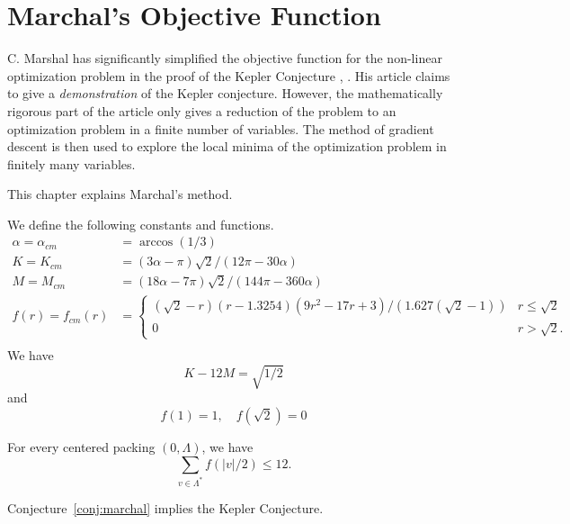 
\chapter{Marchal's Objective Function}

C. Marshal has significantly simplified the objective function
for the non-linear optimization problem in the proof of the Kepler
Conjecture \cite{Mar08}, \cite{Marc07}.  His article claims to give
a {\it demonstration} of the Kepler conjecture.  However, the
mathematically rigorous part of the article only gives a reduction
of the problem to an optimization problem in a finite number of
variables.  The method of gradient descent is then used to explore
the local minima of the optimization problem in finitely many variables.

This chapter explains Marchal's method.  

We define the following constants and functions.
$$
\begin{array}{lll}
\alpha=\alpha_{cm} &= \arccos(1/3)\\
K=K_{cm} &= (3\alpha-\pi)\sqrt2/(12\pi - 30\alpha)\\
M = M_{cm} &= (18\alpha-7\pi)\sqrt2/(144\pi-360\alpha)\\
f(r) = f_{cm}(r) &=
\begin{cases}
 (\sqrt2-r) (r-1.3254) (9r^2 - 17 r + 3)/(1.627 (\sqrt2-1))& r\le\sqrt2\\
 0 & r >\sqrt2.
\end{cases}
\\
\end{array}
$$
We have 
\begin{equation}K - 12M = \sqrt{1/2}\end{equation}
and
\begin{equation}f(1) = 1,\quad f(\sqrt2) =0\end{equation}

\begin{conjecture}[Marchal]\label{conj:marchal} For every centered packing $(0,\Lambda)$,
we have
$$
\sum_{v\in\Lambda^*} f(|v|/2) \le 12.
$$
\end{conjecture}

\begin{theorem}[Marchal] 
Conjecture~\ref{conj:marchal} implies the Kepler Conjecture.
\end{theorem}

